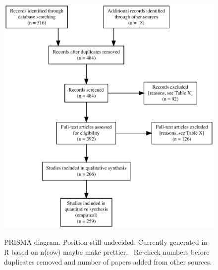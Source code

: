 \documentclass[man, 12pt, a4paper]{apa7}
\newcommand\Warning[1][2ex]{%
  \renewcommand\stacktype{L}%
  \scaleto{\stackon[1.3pt]{\color{red}$\triangle$}{\tiny\bfseries !}}{#1}}%
\begin{document}
\vspace{1em}

\begin{figure}[h]
\centering
\caption{PRISMA diagram. Position still undecided. Currently generated in R based on n(row) maybe make prettier. \Warning\ Re-check numbers before duplicates removed and number of papers added from other sources.}
\includegraphics[width=\textwidth]{Figures/PRISMA}
\label{fig:PRISMA}
\end{figure}
\end{document}
